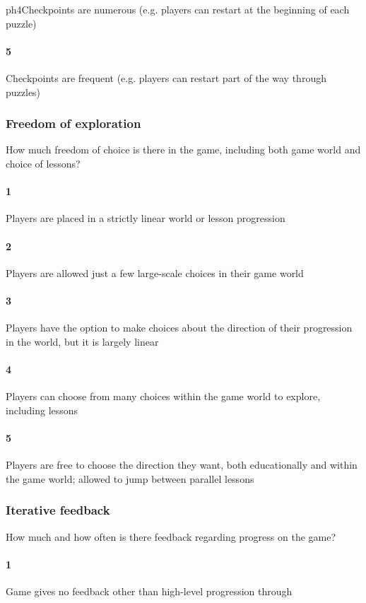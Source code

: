 ph{4}Checkpoints are numerous (e.g. players can restart at the beginning of each puzzle)\paragraph{5}Checkpoints are frequent (e.g. players can restart part of the way through puzzles)\subsubsection{Freedom of exploration}How much freedom of choice is there in the game, including both game world and choice of lessons?\paragraph{1}Players are placed in a strictly linear world or lesson progression\paragraph{2}Players are allowed just a few large-scale choices in their game world\paragraph{3}Players have the option to make choices about the direction of their progression in the world, but it is largely linear\paragraph{4}Players can choose from many choices within the game world to explore, including lessons\paragraph{5}Players are free to choose the direction they want, both educationally and within the game world; allowed to jump between parallel lessons\subsubsection{Iterative feedback}How much and how often is there feedback regarding progress on the game?\paragraph{1}Game gives no feedback other than high-level progression through 